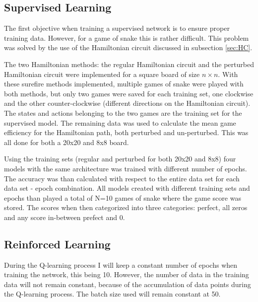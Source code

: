 \documentclass[%
 uio,
 jmp,
 amsmath,amssymb,
 reprint, nofootinbib]{revtex4-1}
\numberwithin{equation}{section}
\begin{document}
\subsection{Supervised Learning}

The first objective when training a supervised network is to ensure proper training data. However, for a game of snake this is rather difficult. This problem was solved by the use of the Hamiltonian circuit discussed in subsection \ref{sec:HC}.

The two Hamiltonian methods: the regular Hamiltonian circuit and the perturbed Hamiltonian circuit were implemented for a square board of size \(n\times n\). With these surefire methods implemented, multiple games of snake were played with both methods, but only two games were saved for each training set, one clockwise and the other counter-clockwise (different directions on the Hamiltonian circuit). The states and actions belonging to the two games are the training set for the supervised model. The remaining data was used to calculate the mean game efficiency for the Hamiltonian path, both perturbed and un-perturbed. This was all done for both a 20x20 and 8x8 board.

Using the training sets (regular and perturbed for both 20x20 and 8x8) four models with the same architecture was trained with different number of epochs. The accuracy was than calculated with respect to the entire data set for each data set - epoch combination. All models created with different training sets and epochs than played a total of N=10 games of snake where the game score was stored. The scores when then categorized into three categories: perfect, all zeros and any score in-between prefect and 0.

\subsection{Reinforced Learning}

During the Q-learning process I will keep a constant number of epochs when training the network, this being 10. However, the number of data in the training data will not remain constant, because of the accumulation of data points during the Q-learning process. The batch size used will remain constant at 50.
\end{document}
